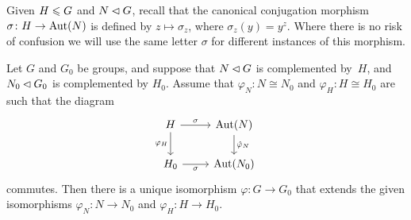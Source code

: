 \medskip Given $H\leqslant G$ and $N\lhd G$, recall that the canonical conjugation morphism $\sigma\colon H\to{\rm Aut}(N)$ is defined by $z\mapsto\sigma_z$, where $\sigma_z(y)=y^z$. Where there is no risk of confusion we will use the same letter $\sigma$ for different instances of this morphism.

\begin{lem}\label{semidirect-product-uniqueness}
    Let\/ $G$ and\/ $G_0$ be groups, and suppose that\/ $N\lhd G$ is complemented by\ $H$, and\/ $N_0\lhd G_0$ is complemented by\/ $H_0$. Assume that\/ $\varphi_N\colon N\cong N_0$ and\/ $\varphi_H\colon H\cong H_0$ are such that the diagram
    $$
        \begin{tikzcd}
            H\arrow[r,"\sigma"]\arrow[d,"\varphi_H"']
                &\Aut(N)\arrow[d,"\hat\varphi_N"]
                \\
            H_0\arrow[r,"\sigma"']
                &\Aut(N_0)
        \end{tikzcd}
    $$
    commutes. Then there is a unique isomorphism\/ $\varphi\colon G\to G_0$ that extends the given isomorphisms\/ $\varphi_N\colon N\to N_0$ and\/ $\varphi_H\colon H\to H_0$.
\end{lem}

